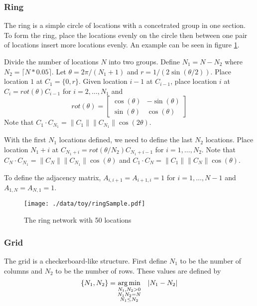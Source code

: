 \documentclass[11pt]{article}
\begin{document}
\subsubsection{Ring}
\label{sec-3-1-3}

The ring is a simple circle of locations with a concetrated group in one
section.  To form the ring, place the locations evenly on the circle
then between one pair of locations insert more locations evenly.  An
example can be seen in figure \ref{fig:ring25}.

Divide the number of locations $N$ into two groups.  Define $N_1 = N -
N_2$ where $N_2 = \lceil N*0.05 \rceil$.  Let $\theta = 2\pi/(N_1+1)$
and $r = 1/(2\sin(\theta/2))$.  Place location $1$ at $C_1 = \lbrace
0,r \rbrace$.  Given location $i-1$ at $C_{i-1}$, place location $i$
at $C_i = rot(\theta) C_{i-1}$ for $i = 2,\ldots,N_1$ and
\begin{equation*}
  rot(\theta) = \left[
    \begin{matrix}
      \cos(\theta) & -\sin(\theta)\\
      \sin(\theta) & \cos(\theta)
    \end{matrix}
  \right]
\end{equation*}
Note that $C_{1} \cdot C_{N_1} = \|C_{1}\| \|C_{N_1}\| \cos(2\theta)$.

With the first $N_1$ locations defined, we need to define the last
$N_2$ locations.  Place location $N_1 + i$ at $C_{N_1 + i} =
rot(\theta/N_2)C_{N_1 + i - 1}$ for $i = 1,\ldots,N_2$.  Note that
$C_{N} \cdot C_{N_1} = \|C_{N}\| \|C_{N_1}\| \cos(\theta)$ and $C_{1}
\cdot C_{N} = \|C_{1}\| \|C_{N}\| \cos(\theta)$.

To define the adjacency matrix, $A_{i,i+1} = A_{i+1,i} = 1$ for $i =
1,\ldots,N-1$ and $A_{1,N} = A_{N,1} = 1$.



\begin{figure}[htb]
\centering
\texttt{[image: ./data/toy/ringSample.pdf]}
\caption{\label{fig:ring25}The ring network with 50 locations}
\end{figure}




\subsubsection{Grid}
\label{sec-3-1-4}

The grid is a checkerboard-like structure.  First define $N_1$ to be
the number of columns and $N_2$ to be the number of rows.  These
values are defined by
\begin{equation*}
  \lbrace N_1, N_2 \rbrace = \underset{
    \begin{subarray}{c}
      N_1,N_2 > 0\\
      N_1N_2 = N\\
      N_1 \le N_2
    \end{subarray}
  }{\arg\min} \quad |N_1 - N_2|
\end{equation*}
\end{document}

